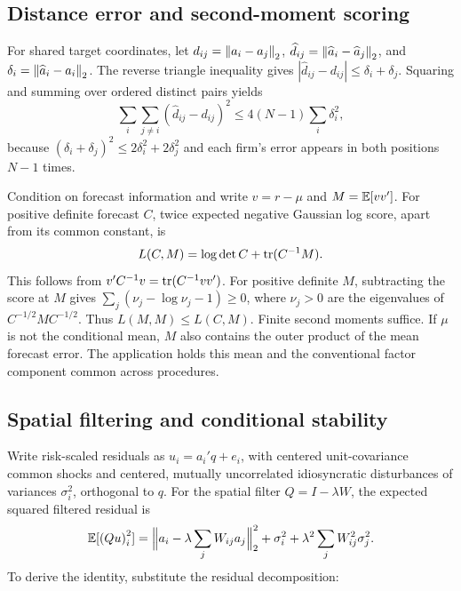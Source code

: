 \documentclass[11pt]{article}
\renewcommand{\lean}[1]{\ignorespaces}
\renewcommand{\leanok}{\ignorespaces}
\begin{document}
\subsection{Distance error and second-moment scoring}
For shared target coordinates, let $d_{ij}=\left\lVert a_i-a_j\right\rVert_2$,
$\widehat d_{ij}=\left\lVert\widehat a_i-\widehat a_j\right\rVert_2$, and
$\delta_i=\left\lVert\widehat a_i-a_i\right\rVert_2$. The reverse triangle inequality gives
$|\widehat d_{ij}-d_{ij}|\le\delta_i+\delta_j$. Squaring and summing
over ordered
distinct pairs yields
\[
  \sum_i\sum_{j\ne i}{(\widehat d_{ij}-d_{ij})}^2
  \le4(N-1)\sum_i\delta_i^2,
\]
because ${(\delta_i+\delta_j)}^2\le2\delta_i^2+2\delta_j^2$ and each
firm's error
appears in both positions $N-1$ times.
\lean{FreeFoundations.Recovery.distance_error,
FreeFoundations.Recovery.pairwise_distance_error}\leanok{}

Condition on forecast information and write $v=r-\mu$ and $M=\mathbb{E}[vv']$.
For positive definite forecast $C$, twice expected negative Gaussian log score,
apart from its common constant, is
\begin{equation}\label{eq:expected-score}
  L(C,M)=\log\det C+\operatorname{tr}(C^{-1}M).
\end{equation}
This follows from $v'C^{-1}v=\operatorname{tr}(C^{-1}vv')$.
For positive definite $M$, subtracting the score at $M$ gives
$\sum_j(\nu_j-\log\nu_j-1)\ge0$, where $\nu_j>0$ are the eigenvalues of
$C^{-1/2}MC^{-1/2}$. Thus $L(M,M)\le L(C,M)$.
\lean{FreeFoundations.Score.expected_loss,
FreeFoundations.Score.loss_le}\leanok{}
Finite second moments suffice. If $\mu$ is not the conditional mean, $M$ also
contains the outer product of the mean forecast error. The application holds
this mean and the conventional factor component common across procedures.

\subsection{Spatial filtering and conditional stability}
Write risk-scaled residuals as $u_i=a_i'q+e_i$, with centered
unit-covariance common shocks and centered, mutually uncorrelated idiosyncratic
disturbances of variances $\sigma_i^2$, orthogonal to $q$. For the spatial
filter $Q=I-\lambda W$, the expected squared filtered residual is
\begin{equation}\label{eq:filtered}
  \mathbb{E}[{(Qu)}_i^2]
  =\Bigl\lVert a_i-\lambda\sum_j W_{ij}a_j\Bigr\rVert_2^2
  +\sigma_i^2+\lambda^2\sum_j W_{ij}^2\sigma_j^2.
\end{equation}
To derive the identity, substitute the residual decomposition:
\end{document}
